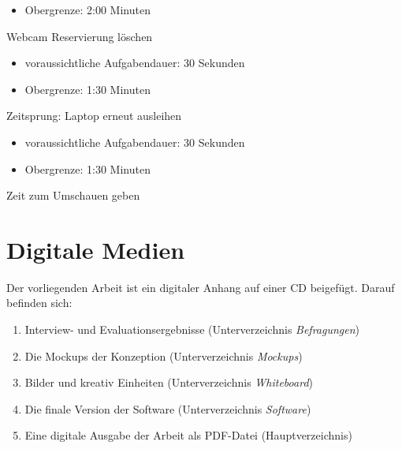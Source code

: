 \begin{compactenum}
\begin{itemize}
                \item Obergrenze: 2:00 Minuten
            \end{itemize}
    \item Webcam Reservierung löschen
            \begin{itemize}
                \item voraussichtliche Aufgabendauer: 30 Sekunden
                \item Obergrenze: 1:30 Minuten
            \end{itemize}
    \item Zeitsprung: Laptop erneut ausleihen
            \begin{itemize}
                \item voraussichtliche Aufgabendauer: 30 Sekunden
                \item Obergrenze: 1:30 Minuten
            \end{itemize}
    \item Zeit zum Umschauen geben
\end{compactenum}

\section{Digitale Medien}
\label{appendix:digitaleMedien}
Der vorliegenden Arbeit ist ein digitaler Anhang auf einer CD beigefügt. Darauf befinden sich:
{\begin{enumerate}
    \item Interview- und Evaluationsergebnisse (Unterverzeichnis \textit{Befragungen})
    \item Die Mockups der Konzeption (Unterverzeichnis \textit{Mockups})
    \item Bilder und kreativ Einheiten (Unterverzeichnis \textit{Whiteboard})
    \item Die finale Version der Software (Unterverzeichnis \textit{Software})
    \item Eine digitale Ausgabe der Arbeit als PDF-Datei (Hauptverzeichnis)
\end{enumerate}}
